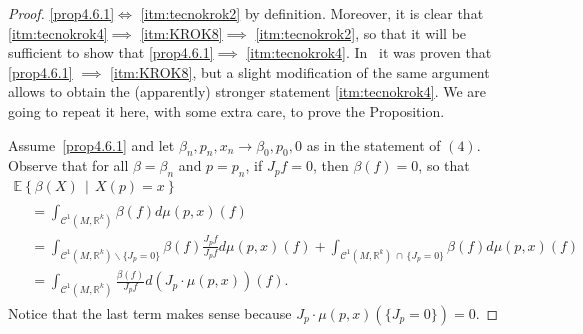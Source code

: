 \documentclass[10pt]{amsart}
\theoremstyle{definition}\newtheorem{defi}[theo]{Definition}\newtheorem{rema}[theo]{Remark}\newtheorem{exam}[theo]{Example}\newtheorem{exem}[theo]{Example}\newtheorem{nota}[theo]{Notation}
\newcommand{\R}{\mathbb{R}}
\newcommand{\EE}{\mathbb{E}}
\newcommand{\mC}{\mathcal{C}}
\begin{document}
\begin{proof}
\eqref{prop4.6.1}$\iff$ \eqref{itm:tecnokrok2} by definition. Moreover, it is clear that \eqref{itm:tecnokrok4}$\implies$ \eqref{itm:KROK8}$\implies$ \eqref{itm:tecnokrok2}, so that it will be sufficient to show that \eqref{prop4.6.1}$\implies$ \eqref{itm:tecnokrok4}. In~\cite[Proposition~2.4]{KRStec} it was proven that \eqref{prop4.6.1} $\implies$ \eqref{itm:KROK8}, but a slight modification of the same argument allows to obtain the (apparently) stronger statement \eqref{itm:tecnokrok4}. We are going to repeat it here, with some extra care, to prove the Proposition.

Assume~\eqref{prop4.6.1} and let $\beta_n,p_n,x_n\to \beta_0,p_0,0$ as in the statement of $(4)$. Observe that for all $\beta=\beta_n$ and $p=p_n$, if $J_{p}f=0$, then $\beta(f)=0$, so that
\begin{multline*}
\EE\left\{\beta(X)\,\middle|\, X(p)=x\right\}\\
\begin{aligned}
&=
\int_{\mC^1(M,\R^k)}\beta(f)d\mu(p,x) (f)\\
&=
\int_{\mC^1(M,\R^k)\smallsetminus \{J_p=0\}}\beta(f)\frac{J_pf}{J_pf}d\mu(p,x) (f) +
\int_{\mC^1(M,\R^k)\,\cap\,\{J_p=0\}}\beta(f)d\mu(p,x) (f)
\\
&=
\int_{\mC^1(M,\R^k)}\frac{\beta(f)}{J_pf}d\left( J_p\cdot \mu(p,x)\right) (f).
\end{aligned}
\end{multline*}
Notice that the last term makes sense because $J_p\cdot \mu(p,x)(\{J_p=0\})=0$.


\end{proof}
\end{document}
